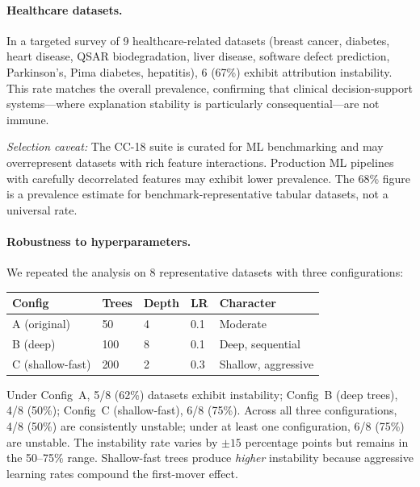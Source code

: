 \documentclass{jmlr}
\begin{document}
\paragraph{Healthcare datasets.}
In a targeted survey of 9 healthcare-related datasets (breast cancer, diabetes, heart disease, QSAR biodegradation, liver disease, software defect prediction, Parkinson's, Pima diabetes, hepatitis), 6 (67\%) exhibit attribution instability. This rate matches the overall prevalence, confirming that clinical decision-support systems---where explanation stability is particularly consequential---are not immune.

\emph{Selection caveat:} The CC-18 suite is curated for ML benchmarking and may overrepresent datasets with rich feature interactions. Production ML pipelines with carefully decorrelated features may exhibit lower prevalence. The 68\% figure is a prevalence estimate for benchmark-representative tabular datasets, not a universal rate.

\paragraph{Robustness to hyperparameters.}
We repeated the analysis on 8 representative datasets with three configurations:

\begin{center}
\small
\begin{tabular}{@{}lllll@{}}
\toprule
Config & Trees & Depth & LR & Character \\
\midrule
A (original) & 50 & 4 & 0.1 & Moderate \\
B (deep) & 100 & 8 & 0.1 & Deep, sequential \\
C (shallow-fast) & 200 & 2 & 0.3 & Shallow, aggressive \\
\bottomrule
\end{tabular}
\end{center}

Under Config~A, 5/8 (62\%) datasets exhibit instability; Config~B (deep trees), 4/8 (50\%); Config~C (shallow-fast), 6/8 (75\%). Across all three configurations, 4/8 (50\%) are consistently unstable; under at least one configuration, 6/8 (75\%) are unstable. The instability rate varies by $\pm 15$ percentage points but remains in the 50--75\% range. Shallow-fast trees produce \emph{higher} instability because aggressive learning rates compound the first-mover effect.
\end{document}
